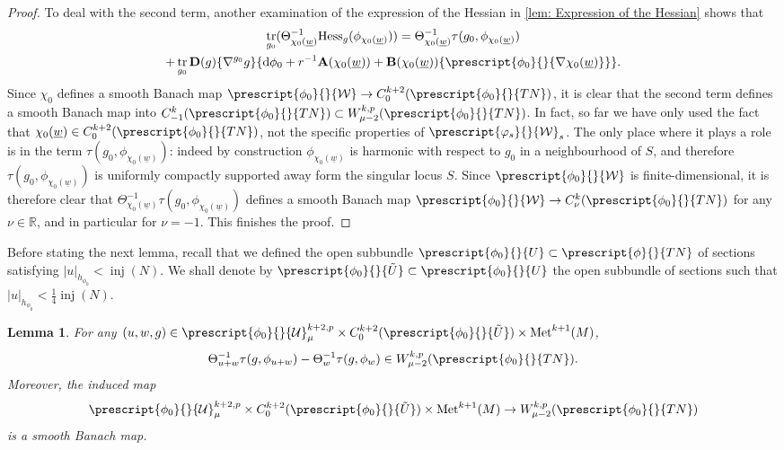 \documentclass{article}
\numberwithin{equation}{section}        %
\theoremstyle{bfnote}
\newtheorem{lem}[thm]{Lemma}                %
\theoremstyle{definition}
\theoremstyle{bfremark}
\newcommand{\R}{\mathbb{R}}                 %
\newcommand{\Met}{\mathrm{Met}}             %
\newcommand{\diff}{\mathrm{d}}                      %
\newcommand{\bmap}[1]{\boldsymbol{\mathrm{#1}}}     %
\DeclareMathOperator{\tr}{tr}                   %
\DeclareMathOperator{\inj}{inj}                 %
\begin{document}
\begin{proof}
    To deal with the second term, another examination of the expression of the Hessian in \cref{lem: Expression of the Hessian} shows that
    \begin{multline*}
        \tr_{g_0}(\Theta_{\chi_{0}(\underline{w})}^{-1} \mathrm{Hess}_{g}(\phi_{\chi_{0}(\underline{w})})) = \Theta_{\chi_{0}(\underline{w})}^{-1} \tau(g_0,\phi_{\chi_{0}(\underline{w})}) \\ + \tr_{g_0}\bmap{D}(g)\{\nabla^{g_0}g\}\{\diff \phi_0 + r^{-1} \bmap{A}(\chi_0(\underline{w})) + \bmap{B}(\chi_0(\underline{w}))\{\prescript{\phi_0}{}{\nabla\chi_0(\underline{w})}\}\} .
    \end{multline*}
    Since $\chi_0$ defines a smooth Banach map $\prescript{\phi_0}{}{\mathcal{W}} \to C^{k+2}_0(\prescript{\phi_0}{}{TN})$, it is clear that the second term defines a smooth Banach map into $C^{k}_{-1}(\prescript{\phi_0}{}{TN}) \subset W^{k,p}_{\mu-2}(\prescript{\phi_0}{}{TN})$. In fact, so far we have only used the fact that $\chi_0(\underline{w}) \in C^{k+2}_0(\prescript{\phi_0}{}{TN})$, not the specific properties of $\prescript{\varphi_s}{}{\mathcal{W}}_s$. The only place where it plays a role is in the term $\tau(g_0,\phi_{\chi_0(\underline{w})})$: indeed by construction $\phi_{\chi_0(\underline{w})}$ is harmonic with respect to $g_0$ in a neighbourhood of $S$, and therefore $\tau(g_0,\phi_{\chi_0(\underline{w})})$ is uniformly compactly supported away form the singular locus $S$. Since $\prescript{\phi_0}{}{\mathcal{W}}$ is finite-dimensional, it is therefore clear that $\Theta_{\chi_0(\underline{w})}^{-1}\tau(g_0,\phi_{\chi_0(\underline{w})})$ defines a smooth Banach map $\prescript{\phi_0}{}{\mathcal{W}} \to C^{k}_\nu(\prescript{\phi_0}{}{TN})$ for any $\nu \in \R$, and in particular for $\nu = -1$. This finishes the proof.
\end{proof}

Before stating the next lemma, recall that we defined the open subbundle $\prescript{\phi_0}{}{U} \subset \prescript{\phi}{}{TN}$ of sections satisfying $|u|_{h_{\phi_0}} < \inj(N)$. We shall denote by $\prescript{\phi_0}{}{\tilde{U}} \subset \prescript{\phi_0}{}{U}$ the open subbundle of sections such that $|u|_{h_{\phi_0}} < \frac{1}{4}\inj(N)$.

\begin{lem}     \label{lem: restricted regularity of tension}
    For any $(u,w,g) \in \prescript{\phi_0}{}{\mathcal{U}}^{k+2,p}_\mu \times C^{k+2}_0(\prescript{\phi_0}{}{\tilde{U}}) \times \Met^{k+1}(M)$,
    \begin{equation*}
        \Theta_{u+w}^{-1} \tau(g,\phi_{u+w}) - \Theta_w^{-1} \tau(g,\phi_w) \in W^{k,p}_{\mu-2}(\prescript{\phi_0}{}{TN}).
    \end{equation*}
    Moreover, the induced map 
    \begin{equation*}
        \prescript{\phi_0}{}{\mathcal{U}}^{k+2,p}_\mu \times C^{k+2}_0(\prescript{\phi_0}{}{\tilde{U}}) \times \Met^{k+1}(M) \to W^{k,p}_{\mu-2}(\prescript{\phi_0}{}{TN})
    \end{equation*}
    is a smooth Banach map.
\end{lem}
\end{document}
